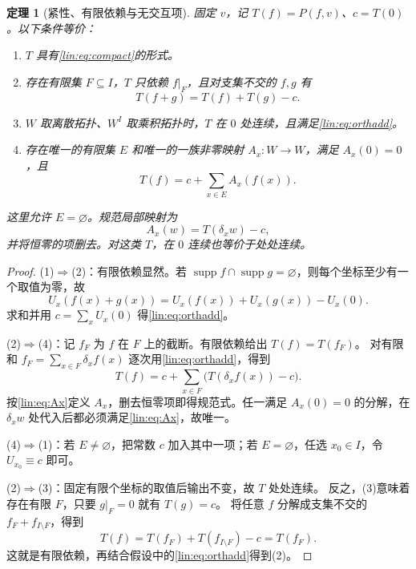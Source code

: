 \documentclass[11pt,a4paper,oneside,openany]{book}
\theoremstyle{lecture}
\newtheorem{theorem}{定理}[section]
\newcommand{\supp}{\operatorname{supp}}
\numberwithin{equation}{section}
\begin{document}
\begin{theorem}[紧性、有限依赖与无交互项]\label{lin:thm:compact}
固定 $v$，记 $T(f)=P(f,v)$、$c=T(0)$。以下条件等价：
\begin{enumerate}
\item $T$ 具有\eqref{lin:eq:compact}的形式。
\item 存在有限集 $F\subseteq I$，$T$ 只依赖 $f|_F$，且对支集不交的 $f,g$ 有
\begin{equation}\label{lin:eq:orthadd}
 T(f+g)=T(f)+T(g)-c.
\end{equation}
\item $W$ 取离散拓扑、$W^I$ 取乘积拓扑时，$T$ 在 $0$ 处连续，且满足\eqref{lin:eq:orthadd}。
\item 存在唯一的有限集 $E$ 和唯一的一族非零映射 $A_x:W\to W$，满足 $A_x(0)=0$，且
\begin{equation}\label{lin:eq:canonical}
 T(f)=c+\sum_{x\in E}A_x(f(x)).
\end{equation}
\end{enumerate}
这里允许 $E=\varnothing$。规范局部映射为
\begin{equation}\label{lin:eq:Ax}
 A_x(w)=T(\delta_xw)-c,
\end{equation}
并将恒零的项删去。对这类 $T$，在 $0$ 连续也等价于处处连续。
\end{theorem}
\begin{proof}
(1)$\Rightarrow$(2)：有限依赖显然。若 $\supp f\cap\supp g=\varnothing$，则每个坐标至少有一个取值为零，故
\[
 U_x(f(x)+g(x))=U_x(f(x))+U_x(g(x))-U_x(0).
\]
求和并用 $c=\sum_xU_x(0)$ 得\eqref{lin:eq:orthadd}。

(2)$\Rightarrow$(4)：记 $f_F$ 为 $f$ 在 $F$ 上的截断。有限依赖给出 $T(f)=T(f_F)$。
对有限和 $f_F=\sum_{x\in F}\delta_xf(x)$ 逐次用\eqref{lin:eq:orthadd}，得到
\[
 T(f)=c+\sum_{x\in F}\bigl(T(\delta_xf(x))-c\bigr).
\]
按\eqref{lin:eq:Ax}定义 $A_x$，删去恒零项即得规范式。任一满足 $A_x(0)=0$ 的分解，在 $\delta_xw$ 处代入后都必须满足\eqref{lin:eq:Ax}，故唯一。

(4)$\Rightarrow$(1)：若 $E\ne\varnothing$，把常数 $c$ 加入其中一项；若 $E=\varnothing$，任选 $x_0\in I$，令 $U_{x_0}\equiv c$ 即可。

(2)$\Rightarrow$(3)：固定有限个坐标的取值后输出不变，故 $T$ 处处连续。
反之，(3)意味着存在有限 $F$，只要 $g|_F=0$ 就有 $T(g)=c$。
将任意 $f$ 分解成支集不交的 $f_F+f_{I\setminus F}$，得到
\[
 T(f)=T(f_F)+T(f_{I\setminus F})-c=T(f_F).
\]
这就是有限依赖，再结合假设中的\eqref{lin:eq:orthadd}得到(2)。
\end{proof}
\end{document}
